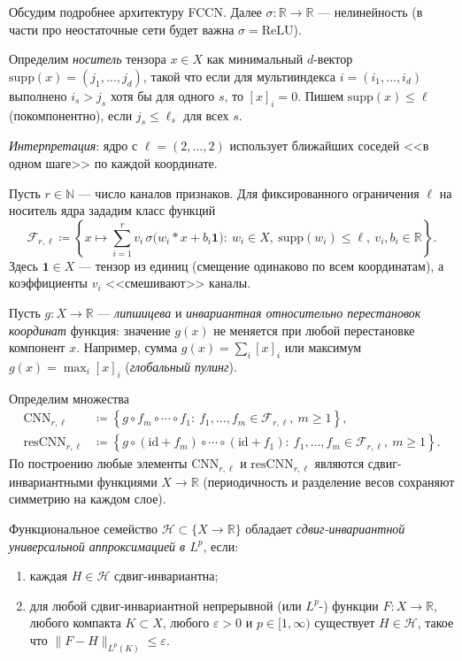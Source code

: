 \documentclass[../NDCNNAI_main.tex]{subfiles}
\begin{document}
Обсудим подробнее архитектуру FCCN.
Далее $\sigma\colon \mathbb{R}\to\mathbb{R}$ --- нелинейность (в части про неостаточные сети будет важна $\sigma=\mathrm{ReLU}$).

\begin{definition}
Определим \emph{носитель} тензора $x\in X$ как минимальный $d$-вектор $\mathrm{supp}(x)=(j_1,\dots,j_d)$, такой что
если для мультииндекса $i=(i_1,\dots,i_d)$ выполнено $i_s>j_s$ хотя бы для одного $s$, то $[x]_i=0$.
Пишем $\mathrm{supp}(x)\le \ell$ (покомпонентно), если $j_s\le \ell_s$ для всех $s$.  
\end{definition}

\textit{Интерпретация}: ядро с $\ell=(2,\dots,2)$ использует ближайших соседей <<в одном шаге>> по каждой координате.

Пусть $r\in\mathbb{N}$ --- число каналов признаков. Для фиксированного ограничения $\ell$ на носитель ядра зададим класс функций
\begin{equation}
\mathcal{F}_{r,\ell}
\coloneq \left\{
x\mapsto \sum_{i=1}^r v_i\,\sigma\!\bigl(w_i*x+b_i\mathbf{1}\bigr)
:\ w_i\in X,\ \mathrm{supp}(w_i)\le \ell,\ v_i,b_i\in\mathbb{R}
\right\}.
\label{eq:Frl}
\end{equation}
Здесь $\mathbf{1}\in X$ --- тензор из единиц (смещение одинаково по всем координатам), а коэффициенты $v_i$ <<смешивают>> каналы.

Пусть $g\colon X\to\mathbb{R}$ --- \emph{липшицева} и \emph{инвариантная относительно перестановок координат} функция:
значение $g(x)$ не меняется при любой перестановке компонент $x$.
Например, сумма $g(x)=\sum_i [x]_i$ или максимум $g(x)=\max_i [x]_i$ (\emph{глобальный пулинг}).


Определим множества
\begin{align}
\mathrm{CNN}_{r,\ell}
&\coloneq \left\{ g\circ f_m\circ\cdots\circ f_1:\ f_1,\dots,f_m\in\mathcal{F}_{r,\ell},\ m\ge 1\right\},\label{eq:CNN}\\
\mathrm{resCNN}_{r,\ell}
&\coloneq \left\{ g\circ (\mathrm{id}+f_m)\circ\cdots\circ (\mathrm{id}+f_1):\ f_1,\dots,f_m\in\mathcal{F}_{r,\ell},\ m\ge 1\right\}.\label{eq:resCNN}
\end{align}
По построению любые элементы $\mathrm{CNN}_{r,\ell}$ и $\mathrm{resCNN}_{r,\ell}$ являются сдвиг-инвариантными функциями $X\to\mathbb{R}$ (периодичность и разделение весов сохраняют симметрию на каждом слое).

\begin{definition}
Функциональное семейство $\mathcal{H}\subset\{X\to\mathbb{R}\}$ обладает \emph{сдвиг-инвариантной универсальной аппроксимацией в $L^p$},
если:
\begin{enumerate}
\item каждая $H\in\mathcal{H}$ сдвиг-инвариантна;
\item для любой сдвиг-инвариантной непрерывной (или $L^p$-) функции $F\colon X\to\mathbb{R}$, любого компакта $K\subset X$, любого $\varepsilon>0$ и $p\in[1,\infty)$
существует $H\in\mathcal{H}$, такое что $\|F-H\|_{L^p(K)}\le \varepsilon$.
\end{enumerate}  
\end{definition}
\end{document}
